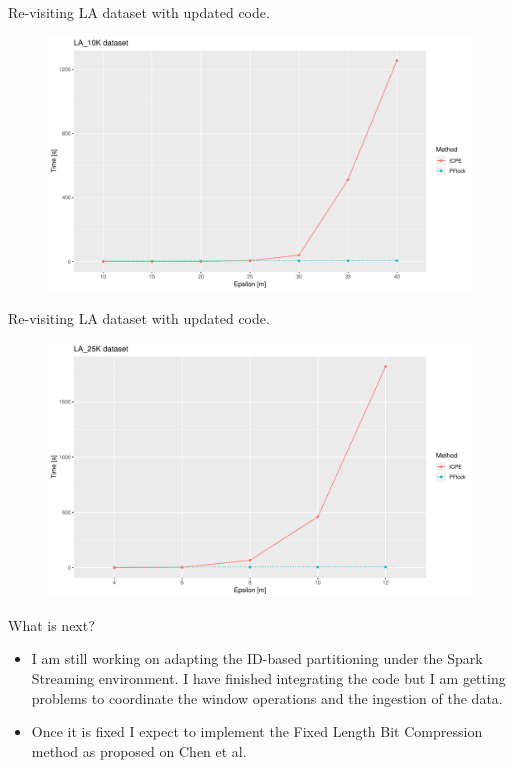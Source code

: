 \documentclass{beamer}
\begin{document}
\begin{frame}{Re-visiting LA dataset}
    {\small with updated code.}
    \centering
    \begin{figure}
        \includegraphics[width=.9\textwidth]{ICPE_10K}
    \end{figure}    
\end{frame}

\begin{frame}{Re-visiting LA dataset}
    {\small with updated code.}
    \centering
    \begin{figure}
        \includegraphics[width=.9\textwidth]{ICPE_25K}
    \end{figure}    
\end{frame}

\begin{frame}{What is next?}
    \begin{itemize}
        \item I am still working on adapting the ID-based partitioning under the Spark Streaming environment. I have finished integrating the code but I am getting problems to coordinate the window operations and the ingestion of the data.
        
        \item Once it is fixed I expect to implement the Fixed Length Bit Compression method as proposed on Chen et al.
    \end{itemize}
\end{frame}
\end{document}
